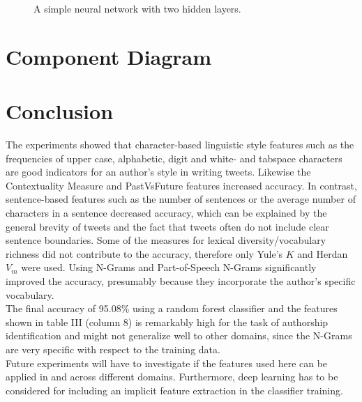 \documentclass[journal, a4paper, 12pt]{IEEEtran}
\begin{document}
\begin{figure}[h]
	\caption{A simple neural network with two hidden layers.}
	\centering
	\vspace{5mm}
\end{figure}

\section{Component Diagram}

\section{Conclusion}
The experiments showed that character-based linguistic style features such as the frequencies of upper case, alphabetic, digit and white- and tabspace characters are good indicators for an author's style in writing tweets. Likewise the Contextuality Measure and PastVsFuture features increased accuracy. In contrast, sentence-based features such as the number of sentences or the average number of characters in a sentence decreased accuracy, which can be explained by the general brevity of tweets and the fact that tweets often do not include clear sentence boundaries. Some of the measures for lexical diversity/vocabulary richness did not contribute to the accuracy, therefore only Yule's $K$ and Herdan $V_m$ were used. Using N-Grams and Part-of-Speech N-Grams significantly improved the accuracy, presumably because they incorporate the author's specific vocabulary.\\
The final accuracy of 95.08\% using a random forest classifier and the features shown in table III (column 8) is remarkably high for the task of authorship identification and might not generalize well to other domains, since the N-Grams are very specific with respect to the training data.\\
Future experiments will have to investigate if the features used here can be applied in and across different domains. Furthermore, deep learning has to be considered for including an implicit feature extraction in the classifier training.
\end{document}
